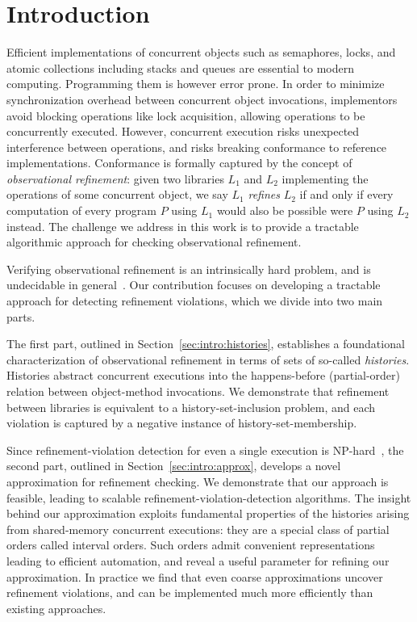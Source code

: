 \section{Introduction}

Efficient implementations of concurrent objects such as semaphores, locks, and
atomic collections including stacks and queues are essential to modern
computing. Programming them is however error prone. In order to minimize
synchronization overhead between concurrent object invocations, implementors
avoid blocking operations like lock acquisition, allowing operations to be
concurrently executed. However, concurrent execution risks unexpected
interference between operations, and risks breaking conformance to reference
implementations. Conformance is formally captured by the concept of
\emph{observational refinement}: given two libraries $L_1$ and $L_2$
implementing the operations of some concurrent object, we say $L_1$
\emph{refines} $L_2$ if and only if every computation of every program $P$
using $L_1$ would also be possible were $P$ using $L_2$ instead. The challenge
we address in this work is to provide a tractable algorithmic approach for
checking observational refinement.

Verifying observational refinement is an intrinsically hard problem, and is
undecidable in general~\cite{conf/esop/BouajjaniEEH13}. Our contribution
focuses on developing a tractable approach for detecting refinement violations,
which we divide into two main parts.

The first part, outlined in Section~\ref{sec:intro:histories}, establishes a
foundational characterization of observational refinement in terms of sets of
so-called \emph{histories}. Histories abstract concurrent executions into the
happens-before (partial-order) relation between object-method invocations. We
demonstrate that refinement between libraries is equivalent to a
history-set-inclusion problem, and each violation is captured by a negative
instance of history-set-membership.

Since refinement-violation detection for even a single execution is
NP-hard~\cite{journals/siamcomp/GibbonsK97}, the second part, outlined in
Section~\ref{sec:intro:approx}, develops a novel approximation for refinement
checking. We demonstrate that our approach is feasible, leading to scalable
refinement-violation-detection algorithms. The insight behind our approximation
exploits fundamental properties of the histories arising from shared-memory
concurrent executions: they are a special class of partial orders called
interval orders. Such orders admit convenient representations leading to
efficient automation, and reveal a useful parameter for refining our
approximation. In practice we find that even coarse approximations uncover
refinement violations, and can be implemented much more efficiently than
existing approaches.


